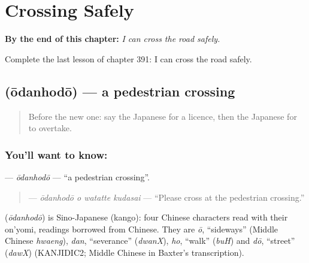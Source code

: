 
\chapter{Crossing Safely}
\label{ch:ja-crossing-safely}

\begin{chapteropening}
\textbf{By the end of this chapter:} \emph{I can cross the road safely.}

Complete the last lesson of chapter 391: I can cross the road safely.
\end{chapteropening}

\section[\texorpdfstring{\ja{おうだんほどう} (ōdanhodō)}{おうだんほどう (ōdanhodō)}]{ (ōdanhodō) — a pedestrian crossing}

\label{lesson:JA-C391-oudanhodou}



\begin{quote}
Before the new one: say the Japanese for a licence, then the Japanese for to overtake.
\end{quote}

\subsection*{You'll want to know: }
\textbf{} — \emph{ōdanhodō} — \textquotedblleft{}a pedestrian crossing\textquotedblright{}.

\begin{quote}
\textbf{  } — \emph{ōdanhodō o watatte kudasai} — \textquotedblleft{}Please cross at the pedestrian crossing.\textquotedblright{}
\end{quote}

\begin{cousinweb}
\textbf{} (\emph{ōdanhodō}) is Sino-Japanese (kango): four Chinese characters read with their on'yomi, readings borrowed from Chinese. They are \emph{ō}, \textquotedblleft{}sideways\textquotedblright{} (Middle Chinese \emph{hwaeng}), \emph{dan}, \textquotedblleft{}severance\textquotedblright{} (\emph{dwanX}), \emph{ho}, \textquotedblleft{}walk\textquotedblright{} (\emph{buH}) and \emph{dō}, \textquotedblleft{}street\textquotedblright{} (\emph{dawX}) (KANJIDIC2; Middle Chinese in Baxter's transcription).
\end{cousinweb}

